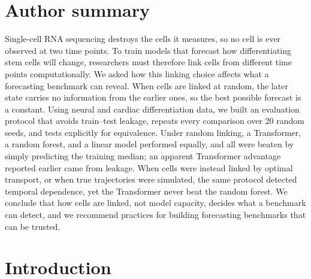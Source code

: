 \documentclass[10pt,letterpaper]{article}
\begin{document}

\section*{Author summary}
Single-cell RNA sequencing destroys the cells it measures, so no cell is ever observed at two time points. To train models that forecast how differentiating stem cells will change, researchers must therefore link cells from different time points computationally. We asked how this linking choice affects what a forecasting benchmark can reveal. When cells are linked at random, the later state carries no information from the earlier ones, so the best possible forecast is a constant. Using neural and cardiac differentiation data, we built an evaluation protocol that avoids train--test leakage, repeats every comparison over 20 random seeds, and tests explicitly for equivalence. Under random linking, a Transformer, a random forest, and a linear model performed equally, and all were beaten by simply predicting the training median; an apparent Transformer advantage reported earlier came from leakage. When cells were instead linked by optimal transport, or when true trajectories were simulated, the same protocol detected temporal dependence, yet the Transformer never beat the random forest. We conclude that how cells are linked, not model capacity, decides what a benchmark can detect, and we recommend practices for building forecasting benchmarks that can be trusted.


\clearpage
{}
\linenumbers

\section*{Introduction}
\label{sec:intro}
\end{document}
